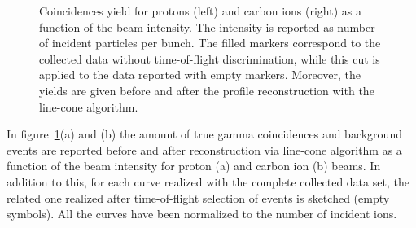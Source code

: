 \begin{figure} [!h]
  \caption{Coincidences yield for protons (left) and carbon ions (right) as a function of the beam intensity. The intensity is reported as number of incident particles per bunch. The filled markers correspond to the collected data without time-of-flight discrimination, while this cut is applied to the data reported with empty markers. Moreover, the yields are given before and after the profile reconstruction with the line-cone algorithm.}
  \label{fig:coincidences}
\end{figure}

In figure~\ref{fig:coincidences}(a) and (b) the amount of true gamma coincidences and background events are reported before and after reconstruction via line-cone algorithm as a function of the beam intensity for proton (a) and carbon ion (b) beams. In addition to this, for each curve realized with the complete collected data set, the related one realized after time-of-flight selection of events is sketched (empty symbols). All the curves have been normalized to the number of incident ions.

